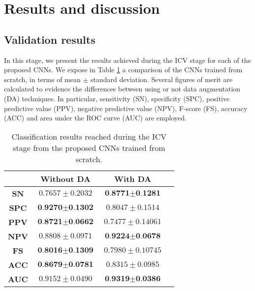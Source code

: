 \section{Results and discussion} \label{sec: Results}

\subsection{Validation results}

In this stage, we present the results achieved during the ICV stage for each of the proposed CNNs. We expose in Table \ref{valRes_fromScratch} a comparison of the CNNs trained from scratch, in terms of mean $\pm$ standard deviation. Several figures of merit are calculated to evidence the differences between using or not data augmentation (DA) techniques. In particular, sensitivity (SN), specificity (SPC), positive predictive value (PPV), negative predictive value (NPV), F-score (FS), accuracy (ACC) and area under the ROC curve (AUC) are employed. 

\begin{table}[h]
\caption{Classification results reached during the ICV stage from the proposed CNNs trained from scratch.}
\label{valRes_fromScratch}
\setlength\tabcolsep{8 pt}
\small
\begin{center}
\begin{tabular}{cccc}
\hline
\multicolumn{1}{l}{}{} & \textbf{Without DA}       & \textbf{With DA} \\
\hline
\textbf{SN}         & $0.7657 \pm 0.2032$         &                  $\textbf{0.8771}\pm\textbf{0.1281}$\\
\textbf{SPC}        & $\textbf{0.9270} \pm \textbf{0.1302}$  &      $0.8047 \pm 0.1514$ \\
\textbf{PPV}        & $\textbf{0.8721} \pm \textbf{0.0662}$  &      $0.7477\pm 0.14061$  \\
\textbf{NPV}        & $0.8808 \pm  0.0971$                   &      $\textbf{0.9224} \pm \textbf{0.0678}$ \\
\textbf{FS}         & $\textbf{0.8016} \pm \textbf{0.1309}$  &      $0.7980\pm 0.10745$   \\
\textbf{ACC}        & $\textbf{0.8679} \pm \textbf{0.0781}$  &      $0.8315 \pm 0.0985$ \\
\textbf{AUC}        & $0.9152 \pm 0.0490$     &                     $\textbf{0.9319} \pm \textbf{0.0386}$\\
\hline
\end{tabular}
\end{center}
\end{table}

